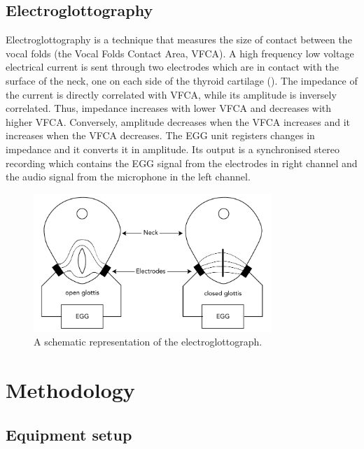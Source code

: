 \documentclass[11pt,A4paper,]{article}
\begin{document}
\subsection{Electroglottography}\label{electroglottography}

Electroglottography \citep{fabre1957} is a technique that measures the
size of contact between the vocal folds (the Vocal Folds Contact Area,
VFCA). A high frequency low voltage electrical current is sent through
two electrodes which are in contact with the surface of the neck, one on
each side of the thyroid cartilage (). The impedance
of the current is directly correlated with VFCA, while its amplitude is
inversely correlated. Thus, impedance increases with lower VFCA and
decreases with higher VFCA. Conversely, amplitude decreases when the
VFCA increases and it increases when the VFCA decreases. The EGG unit
registers changes in impedance and it converts it in amplitude. Its
output is a synchronised stereo recording which contains the EGG signal
from the electrodes in right channel and the audio signal from the
microphone in the left channel.

\begin{figure}[htbp]
\centering
\includegraphics[width=0.80000\textwidth]{../graphics/egg-setup.pdf}
\caption{A schematic representation of the
electroglottograph.\label{f:egg-setup}}
\end{figure}

\section{Methodology}\label{methodology}

\subsection{Equipment setup}\label{s:setup}
\end{document}
